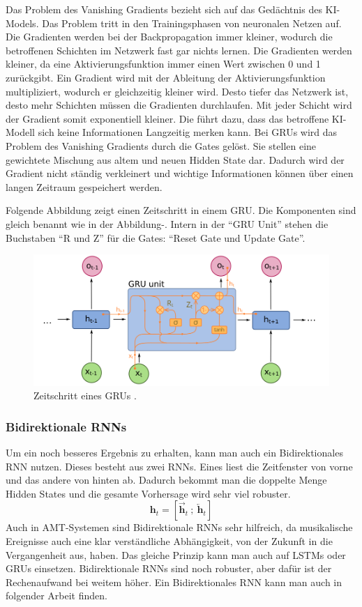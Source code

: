 Das Problem des Vanishing Gradients bezieht sich auf das Gedächtnis des KI-Models.
Das Problem tritt in den Trainingsphasen von neuronalen Netzen auf.
Die Gradienten werden bei der Backpropagation immer kleiner,
wodurch die betroffenen Schichten im Netzwerk fast gar nichts lernen.
Die Gradienten werden kleiner, da eine Aktivierungsfunktion immer einen Wert zwischen 0 und 1 zurückgibt.
Ein Gradient wird mit der Ableitung der Aktivierungsfunktion multipliziert, wodurch er gleichzeitig kleiner wird.
Desto tiefer das Netzwerk ist, desto mehr Schichten müssen die Gradienten durchlaufen.
Mit jeder Schicht wird der Gradient somit exponentiell kleiner.
Die führt dazu, dass das betroffene KI-Modell sich keine Informationen Langzeitig merken kann.
Bei GRUs wird das Problem des Vanishing Gradients durch die Gates gelöst.
Sie stellen eine gewichtete Mischung aus altem und neuen Hidden State dar.
Dadurch wird der Gradient nicht ständig verkleinert
und wichtige Informationen können über einen langen Zeitraum gespeichert werden.

Folgende Abbildung zeigt einen Zeitschritt in einem GRU.
Die Komponenten sind gleich benannt wie in der Abbildung-.
Intern in der \enquote{GRU Unit} stehen die Buchstaben \enquote{R und Z} für die Gates:
\enquote{Reset Gate und Update Gate}.
\begin{figure}[H]
    \centering
    \includegraphics[width=1\textwidth]{Graphics/GRU_timestep}
    \caption[GRU Zeitschritt]{Zeitschritt eines GRUs \cite{wikimediaRNN}.}
    \label{fig:gru_timestep}
\end{figure}

\subsubsection{Bidirektionale RNNs}
Um ein noch besseres Ergebnis zu erhalten, kann man auch ein Bidirektionales RNN nutzen.
Dieses besteht aus zwei RNNs.
Eines liest die Zeitfenster von vorne und das andere von hinten ab.
Dadurch bekommt man die doppelte Menge Hidden States und die gesamte Vorhersage wird sehr viel robuster.
\[
\mathbf{h}_t = \left[ \overrightarrow{\mathbf{h}}_t \ ;\ \overleftarrow{\mathbf{h}}_t \right]
\]
Auch in AMT-Systemen sind Bidirektionale RNNs sehr hilfreich,
da musikalische Ereignisse auch eine klar verständliche Abhängigkeit, von der Zukunft in die Vergangenheit aus, haben.
Das gleiche Prinzip kann man auch auf LSTMs oder GRUs einsetzen.
Bidirektionale RNNs sind noch robuster, aber dafür ist der Rechenaufwand bei weitem höher.
Ein Bidirektionales RNN kann man auch in folgender Arbeit finden\cite{hawthorne2017onsets}.

